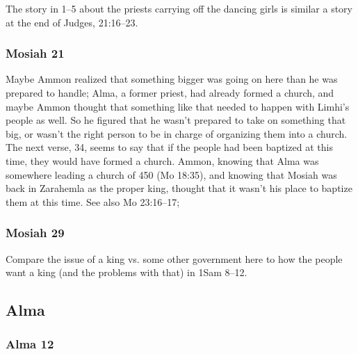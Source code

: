 		The story in 1--5 about the priests carrying off the dancing girls is similar a story at the end of Judges, 21:16--23.

	\subsubsection{Mosiah 21} %

		\begin{compactdesc}

		\item[33$\vert$]
		\begin{compactdesc}
		\item[considering himself an unworthy servant] Maybe Ammon realized that something bigger was going on here than he was prepared to handle; Alma, a former priest, had already formed a church, and maybe Ammon thought that something like that needed to happen with Limhi's people as well. So he figured that he wasn't prepared to take on something that big, or wasn't the right person to be in charge of organizing them into a church. The next verse, 34, seems to say that if the people had been baptized at this time, they would have formed a church. Ammon, knowing that Alma was somewhere leading a church of 450 (Mo 18:35), and knowing that Mosiah was back in Zarahemla as the proper king, thought that it wasn't his place to baptize them at this time. See also Mo 23:16--17;
		\end{compactdesc}

		\end{compactdesc}
		
	\subsubsection{Mosiah 29} %
	
		Compare the issue of a king vs. some other government here to how the people want a king (and the problems with that) in 1Sam 8--12.

\subsection{Alma} %

	\subsubsection{Alma 12} %
	
